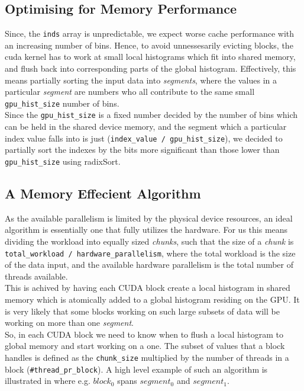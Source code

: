 \documentclass[12pt, a4paper, hidelinks]{article}
\renewcommand{\tt}[1]{\texttt{#1}}
\renewcommand{\it}[1]{\textit{#1}}
\begin{document}
\subsection{Optimising for Memory Performance}
Since, the \tt{inds} array is unpredictable,
we expect worse cache performance with an increasing number of bins.
Hence, to avoid unnessesarily evicting blocks,
the cuda kernel has to work at small local histograms which fit into shared memory,
and flush back into corresponding parts of the global histogram.
Effectively, this means partially sorting the
input data into \it{segments}, where the values in a particular \it{segment}
are numbers who all contribute to the same small \tt{gpu\_hist\_size} number of bins.\\
Since the \tt{gpu\_hist\_size} is a fixed number
decided by the number of bins which can be held in the shared device memory,
and the segment which a particular index value falls into
is just (\tt{index\_value / gpu\_hist\_size}),
we decided to partially sort the indexes by the bits more significant than those
lower than \tt{gpu\_hist\_size} using radixSort.


\subsection{A Memory Effecient Algorithm}
As the available parallelism is limited by the physical device resources,
an ideal algorithm is essentially one that fully utilizes the hardware.
For us this means dividing the workload into
equally sized \it{chunks}, such that the size of a \it{chunk} is
\tt{total\_workload / hardware\_parallelism},
where the total workload is the size of the data input,
and the available hardware parallelism is the total number of threads available.\\
This is achived by having each CUDA block create a local histogram in shared memory
which is atomically added to a global histogram residing on the GPU.
It is very likely that some blocks working on such large subsets of data will
be working on more than one \it{segment}.\\
So, in each CUDA block we need to know when to flush a local histogram to global
memory and start working on a one.
The subset of values that a block handles is defined as the \tt{chunk\_size}
multiplied by the number of threads in a block (\tt{\#thread\_pr\_block}).
A high level example of such an algorithm is illustrated in 
where e.g. $block_0$ spans $segment_0$ and $segment_1$.
\end{document}
